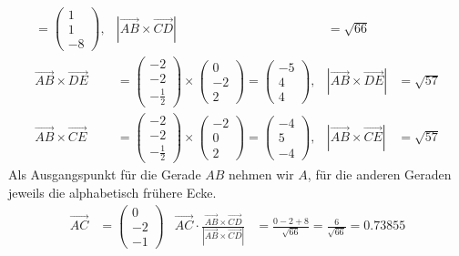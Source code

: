 \begin{loesung}
\begin{align*}
=
\begin{pmatrix}
1\\1\\-8
\end{pmatrix},
&
|\overrightarrow{AB}\times\overrightarrow{CD}|
&=
\sqrt{66}
\\
\overrightarrow{AB}\times\overrightarrow{DE}
&=
\begin{pmatrix} -2\\-2\\-\frac12 \end{pmatrix}
\times
\begin{pmatrix} 0\\-2\\2\end{pmatrix}
=
\begin{pmatrix} -5\\4\\4\end{pmatrix},
&
|\overrightarrow{AB}\times\overrightarrow{DE}|
&=
\sqrt{57}
\\
\overrightarrow{AB}\times\overrightarrow{CE}
&=
\begin{pmatrix} -2\\-2\\-\frac12 \end{pmatrix}
\times
\begin{pmatrix} -2\\0\\2\end{pmatrix}
=
\begin{pmatrix} -4\\5\\-4\end{pmatrix},
&
|\overrightarrow{AB}\times\overrightarrow{CE}|
&=
\sqrt{57}
\end{align*}
Als Ausgangspunkt für die Gerade $AB$ nehmen wir $A$, für
die anderen Geraden jeweils die alphabetisch frühere Ecke.
\begin{align*}
\overrightarrow{AC}
&=
\begin{pmatrix}0\\-2\\-1\end{pmatrix}
&
\overrightarrow{AC}
\cdot
\frac{\overrightarrow{AB}\times\overrightarrow{CD}}{|\overrightarrow{AB}\times\overrightarrow{CD}|}
&=
\frac{0-2+8}{\sqrt{66}}=\frac6{\sqrt{66}}=0.73855
\\

\end{align*}
\end{loesung}
